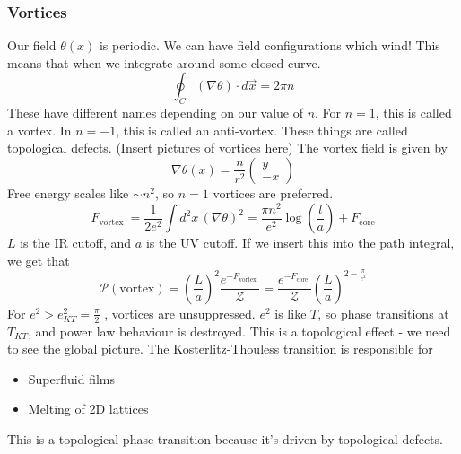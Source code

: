 \subsubsection{Vortices} 
Our field $ \theta ( x) $ is periodic. We can have field configurations 
which wind! This means that when we integrate around some closed curve. 
\[
	\oint_{  C } ( \nabla \theta ) \cdot  d \vec{x}   = 2 \pi n 
\]  These have different names depending on 
our value of $ n $. For $ n = 1 $, this is called a vortex. 
In $ n = - 1$, this is called an anti-vortex. These things are called topological defects. 
(Insert pictures of vortices here)
The vortex field is given by 
\[
	\nabla \theta ( x)  = \frac{n }{ r ^ 2 } \begin{pmatrix}  y \\ - x  \end{pmatrix} 
\]
Free energy scales like $ \sim n ^ 2   $, so $ n = 1$ vortices are preferred. 
\[
	F_{\text{vortex } }  = \frac{1}{2 e ^ 2 } \int d ^ 2 x \, ( \nabla \theta ) ^ 2  = 
	\frac{\pi n ^ 2 }{ e ^ 2 } \log \left(  \frac{l}{a}  \right) +  F_{\text{core}} 
\] $ L $ is the IR cutoff, and $ a $ is the UV cutoff. 
If we insert this into the path integral, we get that 
\[
	\mathcal{ P } ( \text{vortex} )  = \left(\frac{L }{ a }\right) ^ 2  \frac{e ^{  - F_{ \text{vortex }}}}{
	\mathcal{ Z } } = \frac{ e^{ - F_{ \text{core } } }}{ \mathcal{ Z } } \left(  \frac{L }{ a }  \right)^{ 2 - \frac{ \pi }{ e ^ 2}}
\]  For $ e ^ 2 > e ^ 2_{ K T }  = \frac{\pi }{ 2 } $ , vortices are unsuppressed. $ e ^ 2 $ is like $ T $, so 
phase transitions at $ T_{ K T } $, and power law behaviour is destroyed. 
This is a topological effect - we need to see the global picture. 
The Kosterlitz-Thouless transition is responsible for 
\begin{itemize}
	\item Superfluid films
	\item Melting of 2D lattices
\end{itemize}
This is a topological phase transition because it's driven by topological defects. 
\pagebreak 
